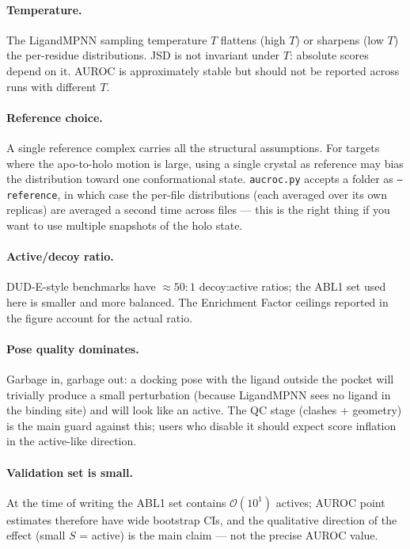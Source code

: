 \documentclass[11pt]{article}
\begin{document}
\paragraph{Temperature.}
The LigandMPNN sampling temperature $T$ flattens (high $T$) or sharpens
(low $T$) the per-residue distributions. JSD is not invariant under $T$:
absolute scores depend on it. AUROC is approximately stable but should
not be reported across runs with different $T$.

\paragraph{Reference choice.}
A single reference complex carries all the structural assumptions. For
targets where the apo-to-holo motion is large, using a single crystal as
reference may bias the distribution toward one conformational state.
\texttt{aucroc.py} accepts a folder as \texttt{--reference}, in which
case the per-file distributions (each averaged over its own replicas) are
averaged a second time across files --- this is the right thing if you
want to use multiple snapshots of the holo state.

\paragraph{Active/decoy ratio.}
DUD-E-style benchmarks have $\approx 50\!:\!1$ decoy:active ratios; the
ABL1 set used here is smaller and more balanced. The Enrichment Factor
ceilings reported in the figure account for the actual ratio.

\paragraph{Pose quality dominates.}
Garbage in, garbage out: a docking pose with the ligand outside the
pocket will trivially produce a small perturbation (because LigandMPNN
sees no ligand in the binding site) and will look like an active. The
QC stage (clashes + geometry) is the main guard against this; users
who disable it should expect score inflation in the active-like
direction.

\paragraph{Validation set is small.}
At the time of writing the ABL1 set contains $\mathcal{O}(10^1)$ actives;
AUROC point estimates therefore have wide bootstrap CIs, and the
qualitative direction of the effect (small $S$ = active) is the main
claim --- not the precise AUROC value.
\end{document}
